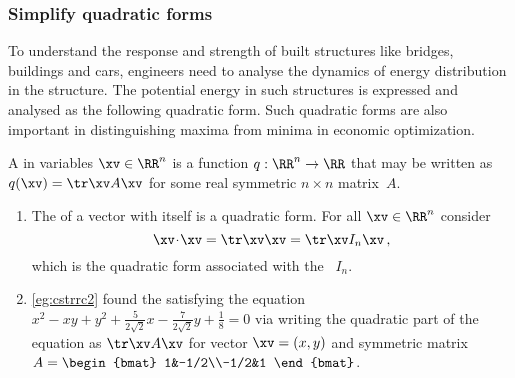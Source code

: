 \begin{comment}
Should include classification of 3D surfaces, but write later. 
Further motivate the following quadratic forms by mentioning some more applications.
\end{comment}






\subsubsection{Simplify quadratic forms}


To understand the response and strength of built structures like bridges, buildings and cars, engineers need to analyse the dynamics of energy distribution in the structure.
The potential energy in such structures is expressed and analysed as the following quadratic form.
Such quadratic forms are also important in distinguishing maxima from minima in economic optimization.

\begin{definition} \label{def:qufo}
A  in variables \(\xv\in\RR^n\) is a function \(q:\RR^n\to\RR\) that may be written as \(q(\xv)=\tr\xv A\xv\) for some real symmetric \(n\times n\) matrix~\(A\).
\end{definition}

\begin{example} 
\begin{enumerate}
\item The  of a vector with itself is a quadratic form.
For all \(\xv\in\RR^n\) consider
\begin{equation*}
\xv\cdot\xv=\tr\xv\xv=\tr\xv I_n\xv\,,
\end{equation*}
which is the quadratic form associated with the ~\(I_n\).


\item \autoref{eg:cstrrc2} found the  satisfying the equation
\(x^2-xy+y^2+\tfrac5{2\sqrt2}x-\tfrac7{2\sqrt2}y+\tfrac18=0\) via writing the quadratic part of the equation as \(\tr\xv A\xv\) for vector \(\xv=(x,y)\) and symmetric matrix \(A=\begin{bmat} 1&-1/2\\-1/2&1 \end{bmat}\).
\end{enumerate}
\end{example}


